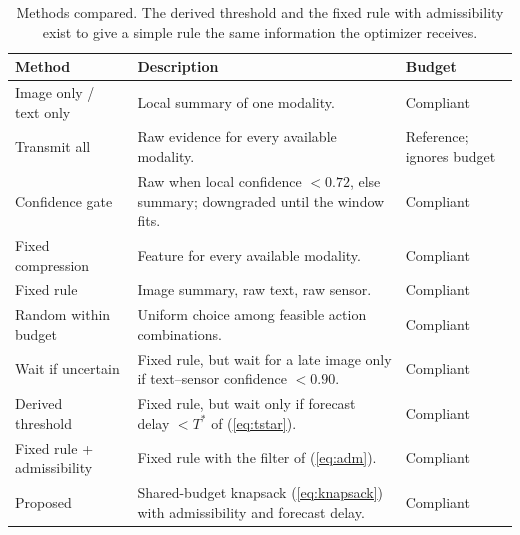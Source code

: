 \documentclass[conference,a4paper]{IEEEtran}
\newif\ifsubmission
\newcommand{\masteronly}[1]{\ifsubmission\else#1\fi}
\begin{document}
\masteronly{%
\begin{table}[t]
\caption{Methods compared. The derived threshold and the fixed rule with admissibility exist to give a simple rule the same information the optimizer receives.}
\label{tab:methods}
\centering\footnotesize
\setlength{\tabcolsep}{3pt}\begin{tabular}{@{}p{1.9cm}p{4.1cm}p{1.4cm}@{}}
\toprule
Method & Description & Budget \\
\midrule
Image only / text only & Local summary of one modality. & Compliant \\
Transmit all & Raw evidence for every available modality. & Reference; ignores budget \\
Confidence gate & Raw when local confidence $<0.72$, else summary; downgraded until the window fits. & Compliant \\
Fixed compression & Feature for every available modality. & Compliant \\
Fixed rule & Image summary, raw text, raw sensor. & Compliant \\
Random within budget & Uniform choice among feasible action combinations. & Compliant \\
Wait if uncertain & Fixed rule, but wait for a late image only if text--sensor confidence $<0.90$. & Compliant \\
Derived threshold & Fixed rule, but wait only if forecast delay $<T^\ast$ of (\ref{eq:tstar}). & Compliant \\
Fixed rule + admissibility & Fixed rule with the filter of (\ref{eq:adm}). & Compliant \\
Proposed & Shared-budget knapsack (\ref{eq:knapsack}) with admissibility and forecast delay. & Compliant \\
\bottomrule
\end{tabular}
\end{table}}%
\end{document}

